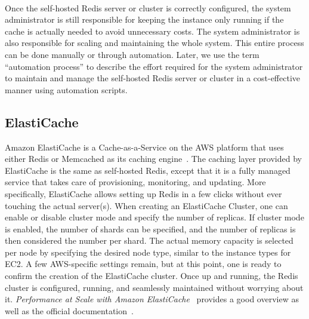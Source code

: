 ~\\
Once the self-hosted Redis server or cluster is correctly configured, the system administrator is still responsible for keeping the instance only running if the cache is actually needed to avoid unnecessary costs. The system administrator is also responsible for scaling and maintaining the whole system. This entire process can be done manually or through automation. Later, we use the term ``automation process'' to describe the effort required for the system administrator to maintain and manage the self-hosted Redis server or cluster in a cost-effective manner using automation scripts. 



\subsection{ElastiCache}
\label{subsec:elasticache}
Amazon ElastiCache is a Cache-as-a-Service on the AWS platform that uses either Redis or Memcached as its caching engine~\cite{noauthor_amazon_nodate-1}. The caching layer provided by ElastiCache is the same as self-hosted Redis, except that it is a fully managed service that takes care of provisioning, monitoring, and updating. More specifically, ElastiCache allows setting up Redis in a few clicks without ever touching the actual server(s). When creating an ElastiCache Cluster, one can enable or disable cluster mode and specify the number of replicas. If cluster mode is enabled, the number of shards can be specified, and the number of replicas is then considered the number per shard. The actual memory capacity is selected per node by specifying the desired node type, similar to the instance types for EC2. A few AWS-specific settings remain, but at this point, one is ready to confirm the creation of the ElastiCache cluster. Once up and running, the Redis cluster is configured, running, and seamlessly maintained without worrying about it. \emph{Performance at Scale with Amazon ElastiCache}~\cite{noauthor_performance_nodate} provides a good overview as well as the official documentation~\cite{noauthor_comparing_nodate}.

